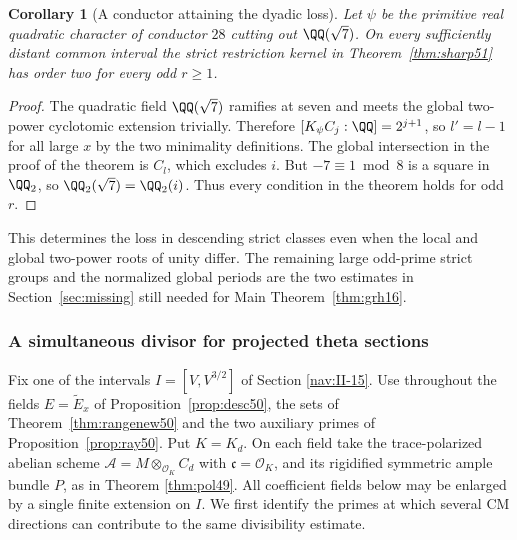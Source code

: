 \documentclass[a4paper,11pt]{article}
\newtheorem{corollary}[proposition]{Corollary}
\theoremstyle{definition}
\theoremstyle{remark}
\numberwithin{equation}{section}
\begin{document}
\begin{corollary}[A conductor attaining the dyadic loss]\label{cor:example51}
Let \(\psi\) be the primitive real quadratic character of conductor
\(28\) cutting out \(\QQ(\sqrt7)\). On every sufficiently distant
common interval the strict restriction kernel in
Theorem~\ref{thm:sharp51} has order two for every odd \(r\ge1\).
\end{corollary}
\begin{proof}
The quadratic field \(\QQ(\sqrt7)\) ramifies at seven and meets the
global two-power cyclotomic extension trivially. Therefore
\([K_\psi C_j:\QQ]=2^{j+1}\), so \(l'=l-1\) for all large \(x\) by
the two minimality definitions. The global intersection in the proof
of the theorem is \(C_l\), which excludes \(i\). But \(-7\equiv1\bmod8\)
is a square in \(\QQ_2\), so \(\QQ_2(\sqrt7)=\QQ_2(i)\). Thus every
condition in the theorem holds for odd \(r\).
\end{proof}

This determines the loss in descending strict classes even when the
local and global two-power roots of unity differ. The remaining
large odd-prime strict groups and the normalized global periods are
the two estimates in Section~\ref{sec:missing} still needed for
Main Theorem~\ref{thm:grh16}.

\subsubsection{A simultaneous divisor for projected theta sections}\label{nav:I-33}
Fix one of the intervals \(I=[V,V^{3/2}]\) of
Section \ref{nav:II-15}.
Use throughout the fields \(E=\widetilde E_x\) of
Proposition~\ref{prop:desc50}, the sets of Theorem~\ref{thm:rangenew50}
and the two auxiliary primes of Proposition~\ref{prop:ray50}. Put
\(K=K_d\). On each field take the trace-polarized abelian scheme
\(\mathcal A=M\otimes_{\mathcal O_K}C_d\) with \(\mathfrak c=\mathcal O_K\),
and its rigidified symmetric ample bundle \(P\), as in
Theorem \ref{thm:pol49}.
All coefficient fields below may be enlarged by a single finite
extension on \(I\). We first identify the primes at which several
CM directions can contribute to the same divisibility estimate.
\end{document}
